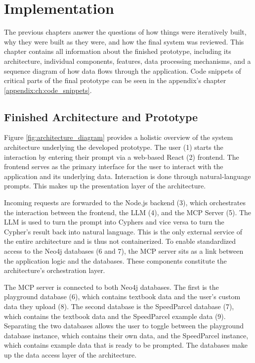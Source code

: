 \chapter{Implementation}
\label{ch:implementation}
The previous chapters answer the questions of how things were iteratively built, why they were built as they were, and how the final system was reviewed. This chapter contains all information about the finished \prototype{} prototype, including its architecture, individual components, features, data processing mechanisms, and a sequence diagram of how data flows through the application. Code snippets of critical parts of the final prototype can be seen in the appendix's chapter \ref{appendix:ch:code_snippets}.
\section{Finished Architecture and Prototype}
\label{sec:architecture}
Figure \ref{fig:architecture_diagram} provides a holistic overview of the system architecture underlying the developed prototype. The user (1) starts the interaction by entering their prompt via a web-based React (2) frontend. The frontend serves as the primary interface for the user to interact with the application and its underlying data. Interaction is done through natural-language prompts. This makes up the presentation layer of the architecture.

Incoming requests are forwarded to the Node.js backend (3), which orchestrates the interaction between the frontend, the LLM (4), and the MCP Server (5). The LLM is used to turn the prompt into Cyphers and vice versa to turn the Cypher's result back into natural language. This is the only external service of the entire architecture and is thus not containerized. To enable standardized access to the Neo4j databases (6 and 7), the MCP server sits as a link between the application logic and the databases. These components constitute the architecture's orchestration layer.

The MCP server is connected to both Neo4j databases. The first is the playground database (6), which contains textbook data and the user's custom data they upload (8). The second database is the SpeedParcel database (7), which contains the textbook data and the SpeedParcel example data (9). Separating the two databases allows the user to toggle between the playground database instance, which contains their own data, and the SpeedParcel instance, which contains example data that is ready to be prompted. The databases make up the data access layer of the architecture.

